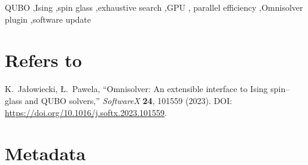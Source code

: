\documentclass[12pt,a4paper]{elsarticle}
\begin{document}
\begin{frontmatter}
\begin{abstract}
\end{abstract}

\begin{keyword}
QUBO \sep Ising \sep spin glass \sep exhaustive search \sep GPU \sep
parallel efficiency \sep Omnisolver plugin \sep software update
\end{keyword}

\end{frontmatter}

\section*{Refers to}
K.~Ja\l{}owiecki, {\L}.~Pawela, ``Omnisolver: An extensible interface to Ising
spin--glass and QUBO solvers,'' \emph{SoftwareX} \textbf{24}, 101559 (2023).
DOI: \url{https://doi.org/10.1016/j.softx.2023.101559}.

\section*{Metadata}
\label{metadata}
\end{document}
